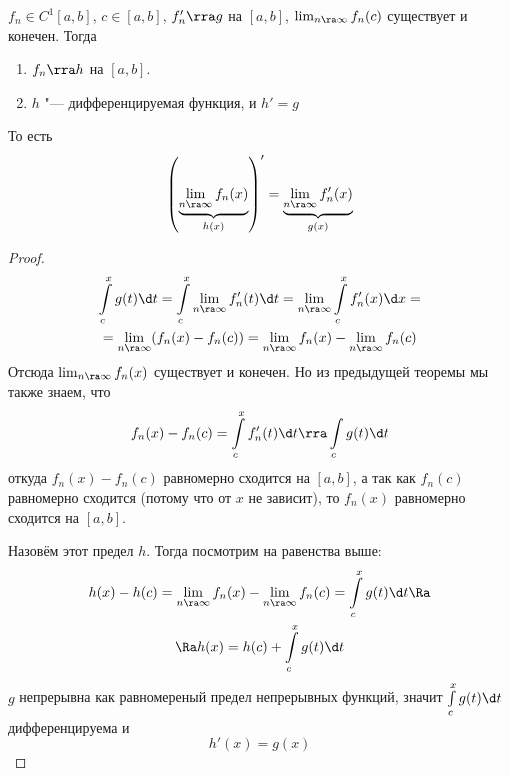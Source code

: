\begin{theorem}
	$f_n \in C^1[a, b]$, $c \in [a, b]$, $f_n' \rra g$ на $[a, b]$, $\lim_{n \ra \infty} f_n(c)$ существует и конечен.
	Тогда
	\begin{enumerate}
		\item $f_n \rra h$ на $[a, b]$.
		\item $h$ "--- дифференцируемая функция, и $h' = g$
	\end{enumerate}
	То есть
	\[ \left(\underbrace{\lim_{n \ra \infty} f_n(x)}_{h(x)}\right)' = \underbrace{\lim_{n \ra \infty} f_n'(x)}_{g(x)} \]
\end{theorem}
\begin{proof}
	\begin{gather*}
		\int\limits_c^x g(t) \d t = \int\limits_c^x \lim_{n \ra \infty} f_n'(t) \d t = \lim_{n \ra \infty} \int\limits_c^x f_n'(x) \d x = \\
		= \lim_{n \ra \infty} (f_n(x) - f_n(c)) = \lim_{n \ra \infty} f_n(x) - \lim_{n \ra \infty} f_n(c)
	\end{gather*}
	Отсюда $\lim_{n \ra \infty} f_n(x)$ существует и конечен.
	Но из предыдущей теоремы мы также знаем, что
	\[ f_n(x) - f_n(c) = \int\limits_c^x f_n'(t) \d t \rra \int\limits_c g(t) \d t \]
	откуда $f_n(x) - f_n(c)$ равномерно сходится на $[a, b]$, а так как $f_n(c)$ равномерно сходится (потому что от $x$ не зависит), то
	$f_n(x)$ равномерно сходится на $[a, b]$.

	Назовём этот предел $h$.
	Тогда посмотрим на равенства выше:
	\begin{gather*}
		h(x) - h(c) = \lim_{n \ra \infty} f_n(x) - \lim_{n \ra \infty} f_n(c) = \int\limits_c^x g(t) \d t \Ra \\
		\Ra h(x) = h(c) + \int\limits_c^x g(t) \d t
	\end{gather*}
	$g$ непрерывна как равномереный предел непрерывных функций, значит $\int\limits_c^x g(t) \d t$ дифференцируема и
	\[ h'(x) = g(x) \]
\end{proof}

